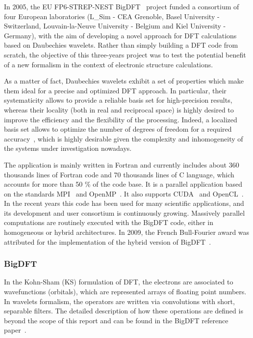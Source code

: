 \documentclass[11pt, a4paper, twoside]{montblanc}
\begin{document}
In 2005, the EU FP6-STREP-NEST BigDFT~\cite{genovese2008daubechies} project
funded a consortium of four European laboratories (L\_Sim - CEA Grenoble, Basel
University - Switzerland, Louvain-la-Neuve University - Belgium and Kiel
University - Germany), with the aim of developing a novel approach for DFT
calculations based on Daubechies wavelets.  Rather than simply building a DFT
code from scratch, the objective of this three-years project was to test the
potential benefit of a new formalism in the context of electronic structure
calculations.

As a matter of fact, Daubechies wavelets exhibit a set of properties which make
them ideal for a precise and optimized DFT approach. In particular, their
systematicity allows to provide a reliable basis set for high-precision
results, whereas their locality (both in real and reciprocal space) is highly
desired to improve the efficiency and the flexibility of the processing. Indeed,
a localized basis set allows to optimize the number of degrees of freedom for a
required accuracy~\cite{genovese2008daubechies}, which is highly desirable given
the complexity and inhomogeneity of the systems under investigation nowadays.

The application is mainly written in Fortran and currently includes about 360
thousands lines of Fortran code and 70 thousands lines of C language, which
accounts for more than 50 \% of the code base. It is a parallel application
based on the standards MPI~\cite{mpi} and OpenMP~\cite{openmp}.  It also
supports CUDA~\cite{cuda} and OpenCL~\cite{opencl}.  In the recent years this
code has been used for many scientific applications, and its development and
user consortium is continuously growing.  Massively parallel computations are
routinely executed with the BigDFT code, either in homogeneous or hybrid
architectures.  In 2009, the French Bull-Fourier award was attributed for the
implementation of the hybrid version of BigDFT~\cite{genovese2009density}.


    \subsubsection{BigDFT}

In the Kohn-Sham (KS) formulation of DFT, the electrons are associated to
wavefunctions (orbitals), which are represented arrays of floating point
numbers. In wavelets formalism, the operators are written via convolutions with
short, separable filters.  The detailed description of how these operations are
defined is beyond the scope of this report and can be found in the BigDFT
reference paper~\cite{genovese2008daubechies}.
\end{document}
